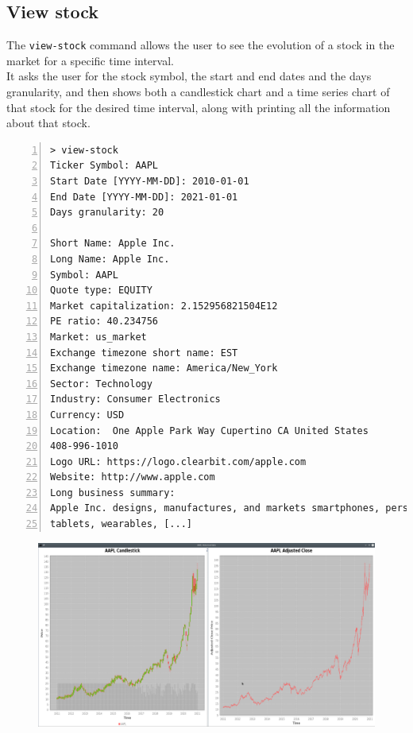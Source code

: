 \subsection{View stock}
The \texttt{view-stock} command allows the user to see the evolution of a stock
in the market for a specific time interval.\\
It asks the user for the stock symbol, the start and end dates and the days
granularity, and then shows both a candlestick chart and a time series chart of
that stock for the desired time interval, along with printing all the
information about that stock.
\vspace{0.2cm}
\begin{lstlisting}[basicstyle=\footnotesize\ttfamily,language={},numbers=left,keepspaces=true,tabsize=4,
numberstyle=\footnotesize,numbersep=8pt,frame=single]
> view-stock
Ticker Symbol: AAPL
Start Date [YYYY-MM-DD]: 2010-01-01
End Date [YYYY-MM-DD]: 2021-01-01
Days granularity: 20

Short Name: Apple Inc.
Long Name: Apple Inc.
Symbol: AAPL
Quote type: EQUITY
Market capitalization: 2.152956821504E12
PE ratio: 40.234756
Market: us_market
Exchange timezone short name: EST
Exchange timezone name: America/New_York
Sector: Technology
Industry: Consumer Electronics
Currency: USD
Location:  One Apple Park Way Cupertino CA United States
408-996-1010
Logo URL: https://logo.clearbit.com/apple.com
Website: http://www.apple.com
Long business summary:
Apple Inc. designs, manufactures, and markets smartphones, personal computers,
tablets, wearables, [...]
\end{lstlisting}
\vspace{-0.6cm}
\begin{figure}[H]
	\begin{center}
        \hspace*{-2.2cm}
		\includegraphics[scale=0.32]{img/user_manual/view_stock.png}
	\end{center}
\end{figure}
\restoregeometry
{}
